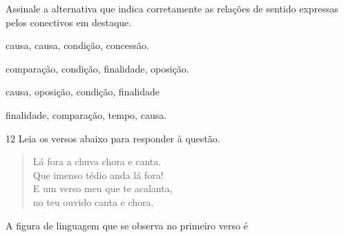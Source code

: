 Assinale a alternativa que indica corretamente as relações de sentido
expressas pelos conectivos em destaque.

\begin{escolha}

    \item causa, causa, condição, concessão.

    \item comparação, condição, finalidade, oposição.

    \item causa, oposição, condição, finalidade

    \item finalidade, comparação, tempo, causa.

\end{escolha}

\num{12} Leia os versos abaixo para responder à questão. 

\begin{myquote}



\begin{verse}

Lá fora a chuva chora e canta. \\
Que imenso tédio anda lá fora! \\
E um verso meu que te acalanta, \\
no teu ouvido canta e chora.


\end{verse}

\end{myquote}

A figura de linguagem que se observa no primeiro verso é

